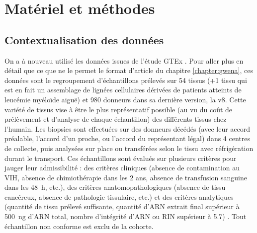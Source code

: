 



\section{Matériel et méthodes}

\subsection{Contextualisation des données}

On a à nouveau utilisé les données issues de l'étude GTEx . Pour aller plus en détail que ce que ne le permet le format d'article du chapitre \ref{chapter:gwena}, ces données sont le regroupement d'échantillons prélevés sur 54 tissus (+1 tissu qui est en fait un assemblage de lignées cellulaires dérivées de patients atteints de leucémie myéloïde aiguë) et 980 donneurs dans sa dernière version, la v8. Cette variété de tissus vise à être le plus représentatif possible (au vu du coût de prélèvement et d'analyse de chaque échantillon) des différents tissus chez l'humain. Les biopsies sont effectuées sur des donneurs décédés (avec leur accord préalable, l'accord d'un proche, ou l'accord du représentant légal) dans 4 centres de collecte, puis analysées sur place ou transférées selon le tissu avec réfrigération durant le transport. Ces échantillons sont évalués sur plusieurs critères pour jauger leur admissibilité : des critères cliniques (absence de contamination au VIH, absence de chimiothérapie dans les 2 ans, absence de transfusion sanguine dans les 48 h, etc.), des critères anatomopathologiques (absence de tissu cancéreux, absence de pathologie tissulaire, etc.) et des critères analytiques (quantité de tissu prélevé suffisante, quantité d'ARN extrait final supérieur à 500 ng d'ARN total, nombre d'intégrité d'ARN ou RIN supérieur à 5.7) . Tout échantillon non conforme est exclu de la cohorte.

